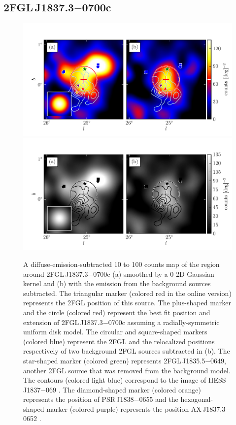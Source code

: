 \subsection{2FGL\,J1837.3$-$0700c}


\begin{figure}[htbp]
    \ifcolorfigure
      \includegraphics{source_plots/source_HESS_J1837-069_color.pdf}
    \else
      \includegraphics{source_plots/source_HESS_J1837-069_bw.pdf}
    \fi
  \caption{
  A diffuse-emission-subtracted 10 \gev to 100 \gev counts map of the
  region around 2FGL\,J1837.3$-$0700c (a) smoothed by a 0 2D Gaussian
  kernel and (b) with the emission from the background sources subtracted.
  The triangular marker (colored red in the online version) represents
  the 2FGL
  position of this source. 
  The plus-shaped marker and 
  the circle (colored red) represent the best fit position and extension
  of 2FGL\,J1837.3$-$0700c assuming a radially-symmetric uniform disk model. 
  The circular and square-shaped markers (colored
  blue) represent the 2FGL and the relocalized positions respectively of
  two background 2FGL sources subtracted in (b).  The star-shaped marker
  (colored green) represents 2FGL\,J1835.5$-$0649, another 2FGL source that was removed from the
  background model.  The contours (colored light blue) correspond to
  the \tev image of HESS\,J1837$-$069
  \citep{aharonian_2006_h.e.s.s.-survey}.
  The diamond-shaped marker (colored orange) represents the position of PSR\,J1838$-$0655
  and the hexagonal-shaped marker (colored purple) represents the position AX\,J1837.3$-$0652
  \citep{gotthelf_2008a_discovery-young}.
  }
\end{figure}



